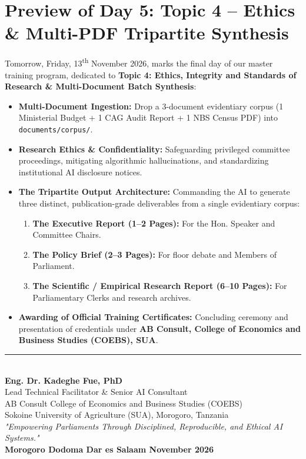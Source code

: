 \documentclass[11pt, a4paper]{report}
\begin{document}
\section{Preview of Day 5: Topic 4 -- Ethics \& Multi-PDF Tripartite Synthesis}
Tomorrow, Friday, 13\textsuperscript{th} November 2026, marks the final day of our master training program, dedicated to \textcolor{suagreen}{\textbf{Topic 4: Ethics, Integrity and Standards of Research \& Multi-Document Batch Synthesis}}:
\begin{itemize}[label=-]
    \item \textbf{Multi-Document Ingestion:} Drop a 3-document evidentiary corpus (1 Ministerial Budget + 1 CAG Audit Report + 1 NBS Census PDF) into \texttt{documents/corpus/}.
    \item \textbf{Research Ethics \& Confidentiality:} Safeguarding privileged committee proceedings, mitigating algorithmic hallucinations, and standardizing institutional AI disclosure notices.
    \item \textbf{The Tripartite Output Architecture:} Commanding the AI to generate three distinct, publication-grade deliverables from a single evidentiary corpus:
    \begin{enumerate}
        \item \textbf{The Executive Report (1--2 Pages):} For the Hon. Speaker and Committee Chairs.
        \item \textbf{The Policy Brief (2--3 Pages):} For floor debate and Members of Parliament.
        \item \textbf{The Scientific / Empirical Research Report (6--10 Pages):} For Parliamentary Clerks and research archives.
    \end{enumerate}
    \item \textbf{Awarding of Official Training Certificates:} Concluding ceremony and presentation of credentials under \textcolor{tanzaniablue}{\textbf{AB Consult, College of Economics and Business Studies (COEBS), SUA}}.
\end{itemize}

\vspace{1.5cm}
\begin{center}
    \rule{0.65\textwidth}{0.4pt}\\[0.3cm]
    \textbf{\Large Eng. Dr. Kadeghe Fue, PhD}\\
    Lead Technical Facilitator \& Senior AI Consultant\\
    AB Consult \textbullet{} College of Economics and Business Studies (COEBS)\\
    Sokoine University of Agriculture (SUA), Morogoro, Tanzania\\[0.3cm]
    \small\textit{"Empowering Parliaments Through Disciplined, Reproducible, and Ethical AI Systems."}\\[0.5cm]
    \textbf{Morogoro \textbullet{} Dodoma \textbullet{} Dar es Salaam \textbullet{} November 2026}
\end{center}
\end{document}
